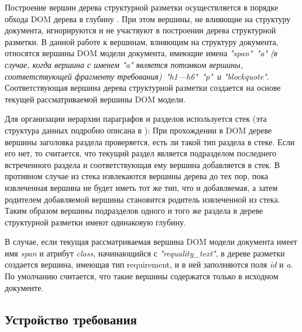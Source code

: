 Построение вершин дерева структурной разметки осуществляется в порядке обхода DOM дерева в глубину \cite{book:Programming}. При этом вершины, не влияющие на структуру документа, игнорируются и не участвуют в построении дерева структурной разметки. В данной работе к вершинам, влияющим на структуру документа, относятся вершины DOM модели документа, имеющие имена \emph{"span"\, "a" (в случае, когда вершина с именем "a" является потомком вершины, соответствующей фрагменту требования)\, "h1---h6"\, "p"\, и "blockquote"}. Соответствующая вершина дерева структурной разметки создается на основе текущей рассматриваемой вершины DOM модели.

Для организации иерархии параграфов и разделов используется стек (эта структура данных подробно описана в \cite{book:Programming}): При прохождении в DOM дереве вершины заголовка раздела проверяется, есть ли такой тип раздела в стеке. Если его нет, то считается, что текущий раздел является подразделом последнего встреченного раздела и соответствующая ему вершина добавляется в стек. В противном случае из стека извлекаются вершины дерева до тех пор, пока извлеченная вершина не будет иметь тот же тип, что и добавляемая, а затем родителем добавляемой вершины становится родитель извлеченной из стека. Таким образом вершины подразделов одного и того же раздела в дереве структурной разметки имеют одинаковую глубину.

В случае, если текущая рассматриваемая вершина DOM модели документа имеет имя \emph{span} и атрибут \emph{class}, начинающийся с \emph{"requality\_text"}, в дереве разметки создается вершина, имеющая тип requirement, и в ней заполняются поля \emph{id} и \emph{a}. По умолчанию считается, что такие вершины содержатся только в исходном документе.

\subsection{Устройство требования}

